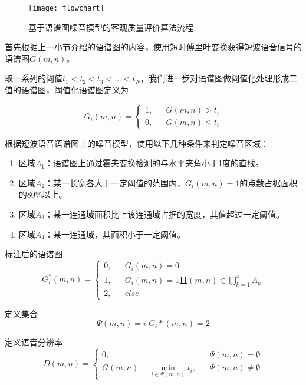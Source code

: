 \begin{figure}
\centering
\texttt{[image: flowchart]}
\caption{基于语谱图噪音模型的客观质量评价算法流程\label{fig:flowchart}}
\end{figure}

首先根据上一小节介绍的语谱图的内容，使用短时傅里叶变换获得短波语音信号的语谱图$G(m,n)$。

取一系列的阈值$t_1<t_2<t_3<...<t_N$，我们进一步对语谱图做阈值化处理形成二值的语谱图，阈值化语谱图定义为

\begin{equation}\label{eq:thr_tf}
G_i(m, n) = \left\{
    \begin{array}{rcl}
    1, && {G(m,n)>t_i} \\
    0, && {G(m,n)\leq t_i}
    \end{array} \right.
\end{equation}

根据短波语音语谱图上的噪音模型，使用以下几种条件来判定噪音区域：
\begin{enumerate}
\item 区域$A_1$：语谱图上通过霍夫变换检测的与水平夹角小于1度的直线。
\item 区域$A_2$：某一长宽各大于一定阈值的范围内，$G_i(m,n)=1$的点数占据面积的80\%以上。
\item 区域$A_3$：某一连通域面积比上该连通域占据的宽度，其值超过一定阈值。
\item 区域$A_4$：某一连通域，其面积小于一定阈值。
\end{enumerate}

标注后的语谱图
\begin{equation}\label{eq:label_tf}
G_i^*(m, n) = \left\{
    \begin{array}{rcl}
    0, && {G_i(m,n)=0} \\
    1, && {G_i(m,n)=1且(m,n)\in \bigcup_{k=1}^4 A_k} \\
    2, && {else}
    \end{array} \right.
\end{equation}

定义集合
\begin{equation}\label{eq:collection}
\Psi(m,n)={i|G_i*(m,n)=2}
\end{equation}

定义语音分辨率
\begin{equation}\label{eq:resolution}
D(m,n) =  \left\{
    \begin{array}{rcl}
    0, && {\Psi(m,n)=\emptyset} \\
    G(m,n) - \min_{i\in\Psi(m,n)}t_i, && {\Psi(m,n)\neq\emptyset}
    \end{array} \right.
\end{equation}

